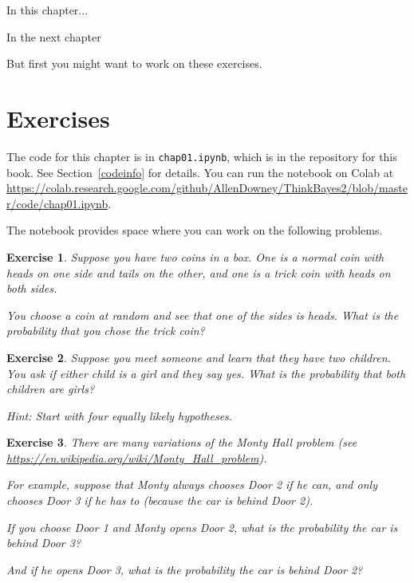 \documentclass[12pt]{book}
\theoremstyle{exercise}
\newtheorem{exercise}{Exercise}[chapter]
\begin{document}
In this chapter...

In the next chapter

But first you might want to work on these exercises.


\section{Exercises}

The code for this chapter is in {\tt chap01.ipynb}, which is in the repository for this book.  See Section~\ref{codeinfo} for details.
You can run the notebook on Colab at \url{https://colab.research.google.com/github/AllenDowney/ThinkBayes2/blob/master/code/chap01.ipynb}.

The notebook provides space where you can work on the following problems.

\begin{exercise}

Suppose you have two coins in a box.
One is a normal coin with heads on one side and tails on the other, and one is a trick coin with heads on both sides.

You choose a coin at random and see that one of the sides is heads.
What is the probability that you chose the trick coin?

\end{exercise}


\begin{exercise}

Suppose you meet someone and learn that they have two children.
You ask if either child is a girl and they say yes.
What is the probability that both children are girls?

Hint: Start with four equally likely hypotheses.

\end{exercise}


\begin{exercise}

There are many variations of the Monty Hall problem (see \url{https://en.wikipedia.org/wiki/Monty_Hall_problem}).  

For example, suppose that Monty always chooses Door 2 if he can, and
only chooses Door 3 if he has to (because the car is behind Door 2).

If you choose Door 1 and Monty opens Door 2, what is the probability the car is behind Door 3?

And if he opens Door 3, what is the probability the car is behind Door 2?

\end{exercise}
\end{document}
